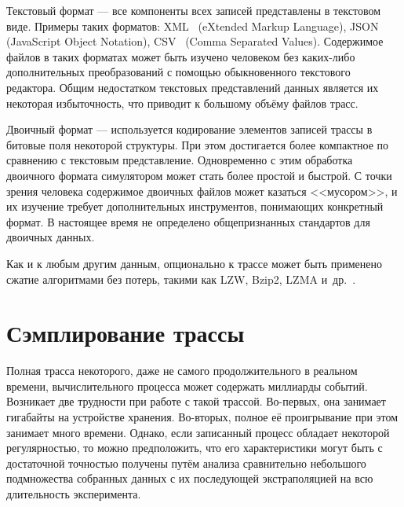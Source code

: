\begin{description*}
    \item[Текстовый формат] --- все компоненты всех записей представлены в текстовом виде. Примеры таких форматов: XML~\cite{xml-std} (\abbr eXtended Markup Language), JSON~\cite{json-std} (\abbr  JavaScript Object Notation), CSV~\cite{csv-rfc} (\abbr Comma Separated Values). Содержимое файлов в таких форматах может быть изучено человеком без каких-либо дополнительных преобразований с помощью обыкновенного текстового редактора. Общим недостатком текстовых представлений данных является их некоторая избыточность, что приводит к большому объёму файлов трасс. 
    
    \item[Двоичный формат] --- используется кодирование элементов записей трассы в битовые поля некоторой структуры. При этом достигается более компактное по сравнению с текстовым представление. Одновременно с этим обработка двоичного формата симулятором может стать более простой и быстрой. С точки зрения человека содержимое двоичных файлов может казаться <<мусором>>, и их изучение требует дополнительных инструментов, понимающих конкретный формат. В настоящее время не определено общепризнанных стандартов для двоичных данных.
\end{description*}

Как и к любым другим данным, опционально к трассе может быть применено сжатие алгоритмами без потерь, такими как LZW, Bzip2, LZMA и~др.~\cite{sayood2002lossless}.

\section{Сэмплирование трассы}\label{sec:sampling}


Полная трасса некоторого, даже не самого продолжительного в реальном времени, вычислительного процесса может содержать миллиарды событий. Возникает две трудности при работе с такой трассой. Во-первых, она занимает гигабайты на устройстве хранения. Во-вторых, полное её проигрывание при этом занимает много времени. Однако, если записанный процесс обладает некоторой регулярностью, то можно предположить, что его характеристики могут быть с достаточной точностью получены путём анализа сравнительно небольшого подмножества собранных данных с их последующей экстраполяцией на всю длительность эксперимента.

